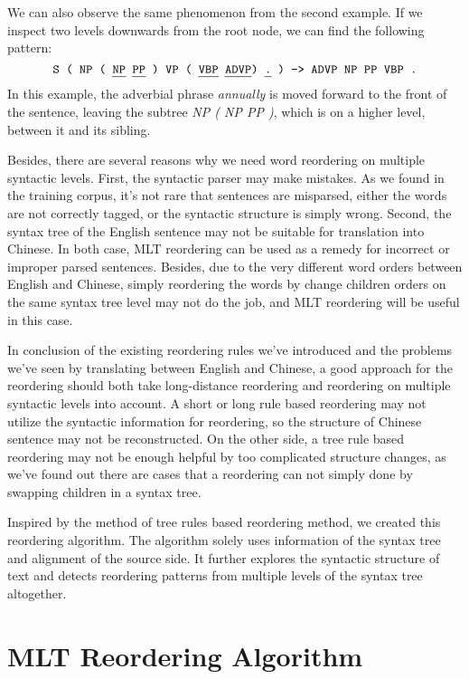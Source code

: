 We can also observe the same phenomenon from the second example. If we inspect two levels downwards from the root node, we can find the following pattern:
$$\texttt{S ( NP ( \ul{NP} \ul{PP} ) VP ( \ul{VBP} \ul{ADVP}) \ul{.} ) -> ADVP NP PP VBP .}$$
In this example, the adverbial phrase \emph{annually} is moved forward to the front of the sentence, leaving the subtree \emph{NP ( NP PP )}, which is on a higher level, between it and its sibling.

Besides, there are several reasons why we need word reordering on multiple syntactic levels. First, the syntactic parser may make mistakes. As we found in the training corpus, it's not rare that sentences are misparsed, either the words are not correctly tagged, or the syntactic structure is simply wrong. Second, the syntax tree of the English sentence may not be suitable for translation into Chinese. In both case, \ac{MLT} reordering can be used as a remedy for incorrect or improper parsed sentences. Besides, due to the very different word orders between English and Chinese, simply reordering the words by change children orders on the same syntax tree level may not do the job, and \ac{MLT} reordering will be useful in this case.

In conclusion of the existing reordering rules we've introduced and the problems we've seen by translating between English and Chinese, a good approach for the reordering should both take long-distance reordering and reordering on multiple syntactic levels into account. A short or long rule based reordering may not utilize the syntactic information for reordering, so the structure of Chinese sentence may not be reconstructed. On the other side, a tree rule based reordering may not be enough helpful by too complicated structure changes, as we've found out there are cases that a reordering can not simply done by swapping children in a syntax tree. 

Inspired by the method of tree rules based reordering method, we created this reordering algorithm. The algorithm solely uses information of the syntax tree and alignment of the source side. It further explores the syntactic structure of text and detects reordering patterns from multiple levels of the syntax tree altogether.

\section{\ac{MLT} Reordering Algorithm}
\label{ch:ReorderingApproach:sec:Algorithm}

